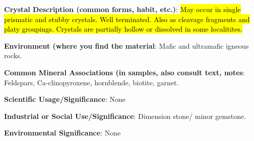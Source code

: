 \documentclass[10pt]{article}
\begin{document}
\begin{framed}
  \textbf{Crystal Description (common forms, habit, etc.)}: \hl{May occur in single prismatic and stubby crystals. Well terminated. Also as cleavage fragments and platy groupings. Crystals are partially hollow or dissolved in some localitites.}
\end{framed}

\begin{framed}
  \textbf{Environment (where you find the material}: Mafic and ultramafic igneous rocks.
\end{framed}

\begin{framed}
  \textbf{Common Mineral Associations (in samples, also consult text, notes}: Feldspars, Ca-clinopyroxene, hornblende, biotite, garnet.
\end{framed}

\begin{framed}
  \textbf{Scientific Usage/Significance}: None
\end{framed}

\begin{framed}
  \textbf{Industrial or Social Use/Significance}:  Dimension stone/ minor gemstone.
\end{framed}

\begin{framed}
  \textbf{Environmental Significance}: None
\end{framed}

\end{document}
